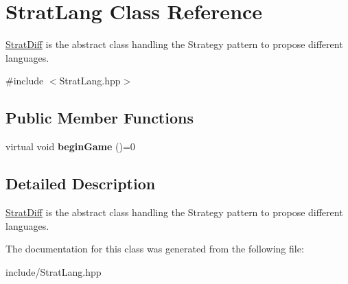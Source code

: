\hypertarget{classStratLang}{\section{Strat\-Lang Class Reference}
\label{classStratLang}
}


\hyperlink{classStratDiff}{Strat\-Diff} is the abstract class handling the Strategy pattern to propose different languages.  




{\ttfamily \#include $<$Strat\-Lang.\-hpp$>$}

\subsection*{Public Member Functions}
\begin{DoxyCompactItemize}
\item 
\hypertarget{classStratLang_aa7a231de0ae7c735b16ae06d898e1141}{virtual void {\bfseries begin\-Game} ()=0}\label{classStratLang_aa7a231de0ae7c735b16ae06d898e1141}

\end{DoxyCompactItemize}


\subsection{Detailed Description}
\hyperlink{classStratDiff}{Strat\-Diff} is the abstract class handling the Strategy pattern to propose different languages. 

The documentation for this class was generated from the following file\-:\begin{DoxyCompactItemize}
\item 
include/Strat\-Lang.\-hpp\end{DoxyCompactItemize}

